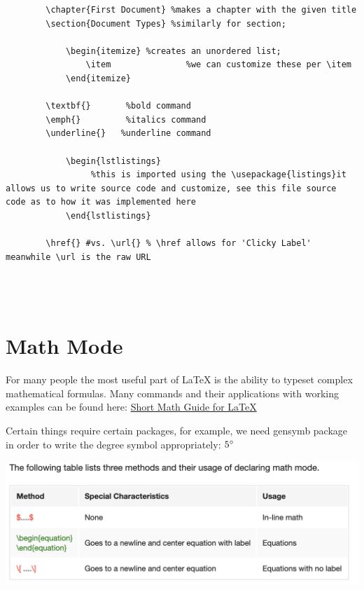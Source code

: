 \documentclass[12pt, letterpaper]{report}
\newcommand{\0}{\emptyset}
\theoremstyle{theorem}
\theoremstyle{definition}
\theoremstyle{definition}
\theoremstyle{definition}
\theoremstyle{definition}
\theoremstyle{theorem}
\theoremstyle{theorem}
\theoremstyle{remark}
\begin{document}
	\begin{lstlisting}
		\chapter{First Document} %makes a chapter with the given title
		\section{Document Types} %similarly for section; 
		
			\begin{itemize} %creates an unordered list;
				\item				%we can customize these per \item 
			\end{itemize}

		\textbf{} 		%bold command
		\emph{}	  		%italics command
		\underline{}   %underline command
		
			\begin{lstlistings}
				 %this is imported using the \usepackage{listings}it allows us to write source code and customize, see this file source code as to how it was implemented here	
			\end{lstlistings}
			
		\href{} #vs. \url{} % \href allows for 'Clicky Label' meanwhile \url is the raw URL

		
		
	\end{lstlisting}
	
\section{Math Mode}

For many people the most useful part of LaTeX is the ability to typeset complex mathematical formulas.  Many commands and their applications with working examples can be found here: \href{http://tug.ctan.org/info/short-math-guide/short-math-guide.pdf}{Short Math Guide for \LaTeX}

Certain things require certain packages, for example, we need gensymb package in order to write the degree symbol appropriately: $5\degree$

	\includegraphics[width=\textwidth]{images/mathopt.png} %
\end{document}

